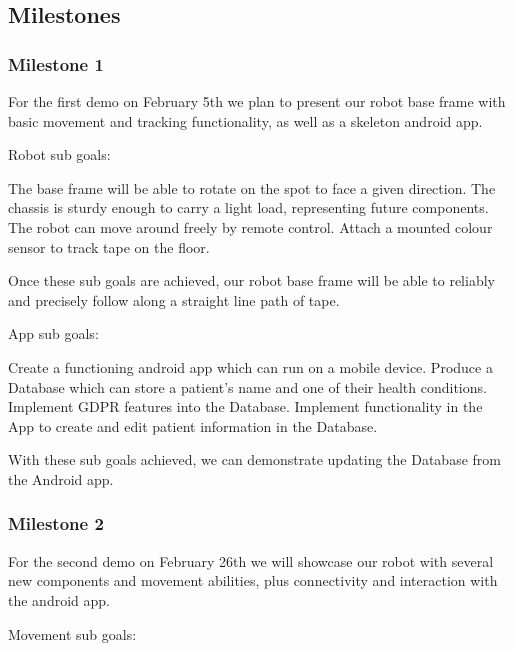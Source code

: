 \documentclass{article}
\begin{document}
\subsection{Milestones} 

\subsubsection{Milestone 1}

For the first demo on February 5th we plan to present our robot base frame with basic movement and tracking functionality, as well as a skeleton android app.

Robot sub goals:

The base frame will be able to rotate on the spot to face a given direction.
The chassis is sturdy enough to carry a light load, representing future components.
The robot can move around freely by remote control.
Attach a mounted colour sensor to track tape on the floor.  

Once these sub goals are achieved, our robot base frame will be able to reliably and precisely follow along a straight line path of tape. 

App sub goals:

Create a functioning android app which can run on a mobile device.
Produce a Database which can store a patient's name and one of their health conditions.
Implement GDPR features into the Database.
Implement functionality in the App to create and edit patient information in the Database.

With these sub goals achieved, we can demonstrate updating the Database from the Android app.

\subsubsection{Milestone 2}

For the second demo on February 26th we will showcase our robot with several new components and movement abilities, plus connectivity and interaction with the android app.  

Movement sub goals:
\end{document}
